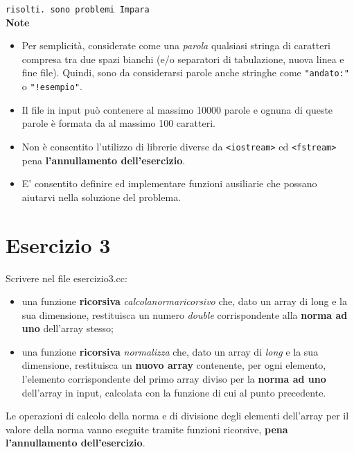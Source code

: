 \documentclass{article}
\begin{document}
    \noindent \texttt{risolti. sono problemi Impara}\\
    
    \noindent \textbf{Note}
    \begin{itemize}
        \item Per semplicità, considerate come una \textit{parola} qualsiasi stringa di caratteri
        compresa tra due spazi bianchi (e/o separatori di tabulazione,
        nuova linea e fine file). Quindi, sono da considerarsi parole anche
        stringhe come \texttt{"andato:"} o \texttt{"!esempio"}.
        \item Il file in input può contenere al massimo 10000 parole e ognuna di
        queste parole è formata da al massimo 100 caratteri.
        \item Non è consentito l'utilizzo di librerie diverse da \texttt{<iostream>} ed \texttt{<fstream>} pena \textbf{l'annullamento dell'esercizio}.
        \item E' consentito definire ed implementare funzioni ausiliarie che possano\\
        aiutarvi nella soluzione del problema.
    \end{itemize}

\section*{Esercizio 3}

    Scrivere nel file esercizio3.cc:\\
    
    \noindent \begin{itemize}
        \item una funzione \textbf{ricorsiva} \textit{calcola\textunderscore norma\textunderscore ricorsivo} che, dato un array di long e la sua dimensione, restituisca un numero \textit{double} corrispondente alla \textbf{norma ad uno} dell’array stesso;
        \item una funzione \textbf{ricorsiva} \textit{normalizza} che, dato un array di \textit{long} e la sua dimensione, restituisca un \textbf{nuovo array} contenente, per ogni elemento, l’elemento corrispondente del primo array diviso per la \textbf{norma ad uno} dell’array in input, calcolata con la funzione di cui al punto precedente.
        
    \end{itemize}
        
    \noindent Le operazioni di calcolo della norma e di divisione degli elementi dell’array per il valore della norma vanno eseguite tramite funzioni ricorsive, \textbf{pena l’annullamento dell’esercizio}.\\
    
\end{document}
